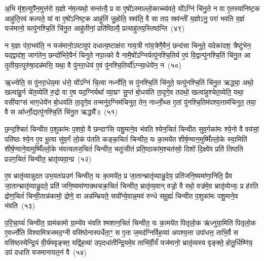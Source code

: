 अ॒भि मृ॑श॒त्युपै॑न॒मुत्त॑रो य॒ज्ञो न॑म॒त्यथो॒ सन्त॑त्यै॒ प्र वा ए॒षो᳚\-ऽस्माल्लो॒काच्च्य॑वते॒ यो᳚\-ऽग्निं चि॑नु॒ते न वा ए॒तस्या॑निष्ट॒क आहु॑ति॒रव॑ कल्पते॒ यां वा ए॒षो॑\-ऽनिष्ट॒क आहु॑तिं जु॒होति॒ स्रव॑ति॒ वै सा ताꣴ स्रव॑न्तीं य॒ज्ञो\-ऽनु॒ परा॑ भवति य॒ज्ञं यज॑मानो॒ यत्पु॑नश्चि॒तिं चि॑नु॒त आहु॑तीनां॒ प्रति॑ष्ठित्यै॒ प्रत्याहु॑तय॒स्तिष्ठ॑न्ति~(४९)

न य॒ज्ञः प॑रा॒भव॑ति॒ न यज॑मानो॒\-ऽष्टावुप॑ दधात्य॒ष्टाक्ष॑रा गाय॒त्री गा॑य॒त्रेणै॒वैनं॒ छन्द॑सा चिनुते॒ यदेका॑\-दश॒ त्रैष्टु॑भेन॒ यद्द्वाद॑श॒ जाग॑तेन॒ छन्दो॑भिरे॒वैनं॑ चिनुते नपा॒त्को वै नामै॒षो᳚\-ऽग्निर्यत्पु॑नश्चि॒तिर्य ए॒वं वि॒द्वान्पु॑नश्चि॒तिं चि॑नु॒त आ तृ॒तीया॒त्पुरु॑षा॒दन्न॑मत्ति॒ यथा॒ वै पु॑नरा॒धेय॑ ए॒वं पु॑नश्चि॒तिर्यो᳚\-ऽग्न्या॒धेये॑न॒ न~(५०)

ऋ॒ध्नोति॒ स पु॑नरा॒धेय॒मा ध॑त्ते॒ यो᳚\-ऽग्निं चि॒त्वा नर्ध्नोति॒ स पु॑नश्चि॒तिं चि॑नुते॒ यत्पु॑नश्चि॒तिं चि॑नु॒त ऋद्ध्या॒ अथो॒ खल्वा॑हु॒र्न चे॑त॒व्येति॑ रु॒द्रो वा ए॒ष यद॒ग्निर्यथा᳚ व्या॒घ्रꣳ सु॒प्तं बो॒धय॑ति ता॒दृगे॒व तदथो॒ खल्वा॑हुश्चेत॒व्येति॒ यथा॒ वसी॑याꣳसं भाग॒धेये॑न बो॒धय॑ति ता॒दृगे॒व  तन्मनु॑र॒ग्निम॑चिनुत॒ तेन॒ नार्ध्नो॒थ्स ए॒तां पु॑नश्चि॒तिम॑पश्य॒त्ताम॑चिनुत॒ तया॒ वै स आ᳚र्ध्नो॒द्यत्पु॑नश्चि॒तिं चि॑नु॒त ऋद्ध्यै᳚॥~(५१)

{\anuvakamend[{त्रि॒वृदथ॒ तिष्ठ॑न्त्यग्न्या॒धेये॑न॒ नाचि॑नुत स॒प्तद॑श च}]}%

छ॒न्द॒श्चितं॑ चिन्वीत प॒शुका॑मः प॒शवो॒ वै छन्दाꣳ॑सि पशु॒माने॒व भ॑वति श्येन॒चितं॑ चिन्वीत सुव॒र्गका॑मः श्ये॒नो वै वय॑सां॒ पति॑ष्ठः श्ये॒न ए॒व भू॒त्वा सु॑व॒र्गं लो॒कं प॑तति कङ्क॒चितं॑ चिन्वीत॒ यः का॒मये॑त शीर्\mbox{}ष॒ण्वान॒मुष्मिँ॑ल्लो॒के स्या॒मिति॑ शीर्\mbox{}ष॒ण्वाने॒वामुष्मिँ॑ल्लो॒के भ॑वत्यलज॒चितं॑ चिन्वीत॒ चतुः॑सीतं प्रति॒ष्ठाका॑म॒श्चत॑स्रो॒ दिशो॑ दि॒क्ष्वे॑व प्रति॑ तिष्ठति प्रउग॒चितं॑ चिन्वीत॒ भ्रातृ॑व्यवा॒न्प्र~(५२)

ए॒व भ्रातृ॑व्यान्नुदत उभ॒यतः॑प्रउगं चिन्वीत॒ यः का॒मये॑त॒ प्र जा॒तान्भ्रातृ॑व्यान्नु॒देय॒ प्रति॑जनि॒ष्यमा॑णा॒निति॒ प्रैव जा॒तान्भ्रातृ॑व्यान्नु॒दते॒ प्रति॑ जनि॒ष्यमा॑णान्रथचक्र॒चितं॑ चिन्वीत॒ भ्रातृ॑व्य॒वान् वज्रो॒ वै रथो॒ वज्र॑मे॒व भ्रातृ॑व्येभ्यः॒ प्र ह॑रति द्रोण॒चितं॑ चिन्वी॒तान्न॑कामो॒ द्रोणे॒ वा अन्न॑म्भ्रियते॒ सयो᳚न्ये॒वान्न॒मव॑ रुन्धे समू॒ह्यं॑ चिन्वीत प॒शुका॑मः पशु॒माने॒व भ॑वति~(५३)

प॒रि॒चा॒य्यं॑ चिन्वीत॒ ग्राम॑कामो ग्रा॒म्ये॑व भ॑वति श्मशान॒चितं॑ चिन्वीत॒ यः का॒मये॑त पितृलो॒क ऋ॑ध्नुया॒मिति॑ पितृलो॒क ए॒वर्ध्नो॑ति विश्वामित्रजमद॒ग्नी वसि॑ष्ठेनास्पर्धेता॒ꣳ॒ स ए॒ता ज॒मद॑ग्निर्विह॒व्या॑ अपश्य॒त्ता उपा॑धत्त॒ ताभि॒र्वै स वसि॑ष्ठस्येन्द्रि॒यं वी॒र्य॑मवृङ्क्त॒ यद्वि॑ह॒व्या॑ उप॒दधा॑तीन्द्रि॒यमे॒व ताभि॑र्वी॒र्यं॑ यज॑मानो॒ भ्रातृ॑व्यस्य वृङ्क्ते॒ होतु॒र्धिष्णि॑य॒ उप॑ दधाति यजमानायत॒नं वै~(५४)

